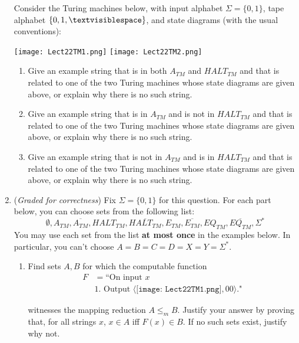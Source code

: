 \documentclass[12pt, oneside]{article}
\begin{document}
\begin{enumerate}
    Consider the Turing machines below, with input alphabet $\Sigma = \{0,1\}$, tape alphabet 
    $\{0, 1, \textvisiblespace\}$, and state diagrams (with the usual conventions):
    \begin{center}
    \texttt{[image: Lect22TM1.png]}\qquad\hfill \qquad
    \texttt{[image: Lect22TM2.png]}
    \end{center}
    \begin{enumerate}
    \item Give an example string that is in both $A_{TM}$ and $HALT_{TM}$ and that is related to one of the 
    two Turing machines whose state diagrams are given above, or explain why there is no such string.
    \item  Give an example string that is in $A_{TM}$ and is not in $HALT_{TM}$ and that is related to one of the 
    two Turing machines whose state diagrams are given above, or explain why there is no such string.
    \item Give an example string that is not in $A_{TM}$ and is in $HALT_{TM}$ and that is related to one of the 
    two Turing machines whose state diagrams are given above, or explain why there is no such string.
    \end{enumerate}
    
    \item ({\it Graded for correctness}) Fix  $\Sigma = \{0,1\}$  for this question. 
    For each part below, you can choose sets from the  following list:  
    \[
    \emptyset, A_{TM}, \overline{A_{TM}}, HALT_{TM}, \overline{HALT_{TM}}, E_{TM}, \overline{E_{TM}}, 
    EQ_{TM}, \overline{EQ_{TM}}, \Sigma^*
    \]
    You may use each set from the list {\bf at most once} in the examples below.  In  particular, you can't choose
    $A =  B = C =  D = X = Y =  \Sigma^*$.

    
    \begin{enumerate}
    \item Find sets $A, B$ for which  the computable function
    \begin{align*}
    F &= \text{``On input $x$} \\
    &\text{1. Output $\langle \texttt{[image: Lect22TM1.png]} , 00\rangle$."}
    \end{align*}
    
    witnesses the mapping reduction $A  \leq_m B$.
    Justify your  answer by  proving that, for all  strings  $x$, $x \in A $ iff  $F(x) \in B$.
    If no such sets exist, justify why not.
    

\end{enumerate}
\end{enumerate}
\end{document}
